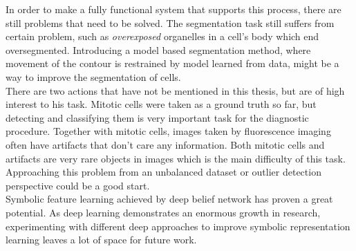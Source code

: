 In order to make a fully functional system that supports this process, there are still problems that need to be solved. The segmentation task still suffers from certain problem, such as \textit{overexposed} organelles in a cell's body which end oversegmented. Introducing a model based segmentation method, where movement of the contour is restrained by model learned from data, might be a way to improve the segmentation of cells. \\

There are two actions that have not be mentioned in this thesis, but are of high interest to his task. Mitotic cells were taken as a ground truth so far, but detecting and classifying them is very important task for the diagnostic procedure. Together with mitotic cells, images taken by fluorescence imaging often have artifacts that don't care any information. Both mitotic cells and artifacts are very rare objects in images which is the main difficulty of this task. Approaching this problem from an unbalanced dataset or outlier detection perspective could be a good start. \\

Symbolic feature learning achieved by deep belief network has proven a great potential. As deep learning demonstrates an enormous growth in research, experimenting with different deep approaches to improve symbolic representation learning leaves a lot of space for future work.